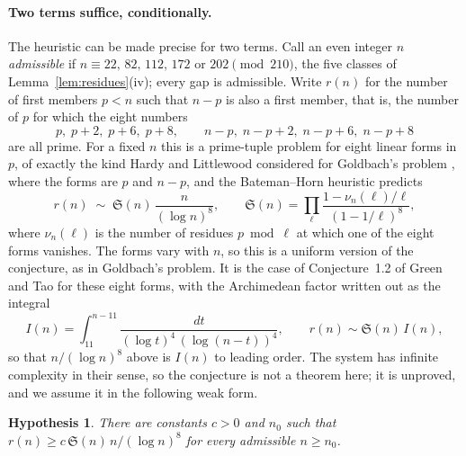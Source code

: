 \documentclass[11pt,a4paper]{article}
\newtheorem{hypothesis}{Hypothesis}
\begin{document}
\paragraph{Two terms suffice, conditionally.}
The heuristic can be made precise for two terms. Call an even integer $n$
\emph{admissible} if $n\equiv 22,\,82,\,112,\,172$ or $202 \pmod{210}$, the
five classes of Lemma~\ref{lem:residues}(iv); every gap is admissible. Write
$r(n)$ for the number of first members $p<n$ such that $n-p$ is also a first
member, that is, the number of $p$ for which the eight numbers
\[
p,\; p+2,\; p+6,\; p+8,\qquad n-p,\; n-p+2,\; n-p+6,\; n-p+8
\]
are all prime. For a fixed $n$ this is a prime-tuple problem for eight
linear forms in $p$, of exactly the kind Hardy and Littlewood considered for
Goldbach's problem \cite{HardyLittlewood1923}, where the forms are $p$ and
$n-p$, and the Bateman--Horn heuristic \cite{BatemanHorn1962} predicts
\[
r(n)\;\sim\;\mathfrak S(n)\,\frac{n}{(\log n)^8},\qquad
\mathfrak S(n)=\prod_{\ell}\frac{1-\nu_n(\ell)/\ell}{(1-1/\ell)^8},
\]
where $\nu_n(\ell)$ is the number of residues $p \bmod \ell$ at which one of
the eight forms vanishes. The forms vary with $n$, so this is a uniform
version of the conjecture, as in Goldbach's problem. It is the case of
Conjecture~1.2 of Green and Tao \cite{GreenTao2010} for these eight forms,
with the Archimedean factor written out as the integral
\[
I(n)=\int_{11}^{n-11}\frac{dt}{(\log t)^4\,(\log(n-t))^4},
\qquad r(n)\sim\mathfrak S(n)\,I(n),
\]
so that $n/(\log n)^8$ above is $I(n)$ to leading order. The system has
infinite complexity in their sense, so the conjecture is not a theorem
here; it is unproved, and we assume it in the following weak form.

\begin{hypothesis}
\label{hyp:H}
There are constants $c>0$ and $n_0$ such that
$r(n)\ge c\,\mathfrak S(n)\,n/(\log n)^8$ for every admissible $n\ge n_0$.
\end{hypothesis}
\end{document}
